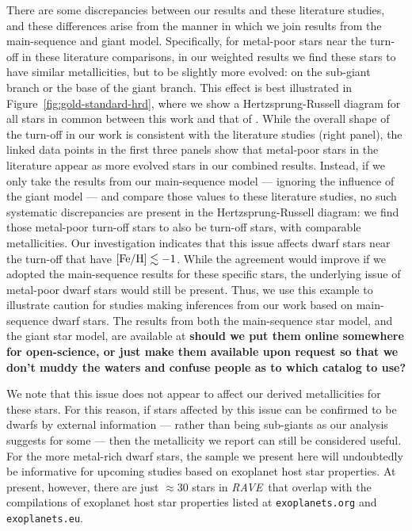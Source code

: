 \documentclass[preprint,trackchanges]{aastex}
\newcommand{\acronym}[1]{{\small{#1}}}
\newcommand{\project}[1]{\textsl{#1}}
\newcommand{\rave}{\project{\acronym{RAVE}}}
\newcommand{\stub}[1]{{\color{blue} \textbf{#1}}}
\begin{document}
There are some discrepancies between our results and these literature studies,
and these differences arise from the manner in which we join results from the
main-sequence and giant model.  Specifically, for metal-poor stars near
the turn-off in these literature comparisons, in our weighted results we find 
these stars to have similar metallicities, but to be slightly more evolved: 
on the sub-giant branch or the base of the giant branch.  This effect is best
illustrated in Figure~\ref{fig:gold-standard-hrd}, where we show a 
Hertzsprung-Russell diagram for all stars in common between this work and that
of \citet{Bensby_2014,Reddy_2003,Reddy_2006,Valenti_Fischer_2005}.  While the
overall shape of the turn-off in our work is consistent with the literature
studies (right panel), the linked data points in the first three panels show that metal-poor stars in the literature
appear as more evolved stars in our combined results.  Instead, if we only
take the results from our main-sequence model --- ignoring the influence of the
giant model --- and compare those values to these literature studies, no such 
systematic discrepancies are present in the Hertzsprung-Russell diagram: we 
find those metal-poor turn-off stars to also be turn-off stars, with comparable
metallicities.  Our investigation indicates that this issue affects dwarf stars
near the turn-off that have $[{\rm Fe/H}] \lesssim -1$.  While the agreement
would improve if we adopted the main-sequence results for these specific stars,
the underlying issue of metal-poor dwarf stars would still be present.  Thus,
we use this example to illustrate caution for studies making inferences from our
work based on main-sequence dwarf stars.  The results from both the main-sequence star model, 
and the giant star model, are available at \stub{should we put them online somewhere
for open-science, or just make them available upon request so that we don't
muddy the waters and confuse people as to which catalog to use?}


We note that this issue does not appear to affect our derived metallicities for these
stars.  For this reason, if stars affected by this issue can be confirmed to be
dwarfs by external information --- rather than being sub-giants as our analysis
suggests for some --- then the metallicity we report can still be considered
useful.  For the more metal-rich dwarf stars, the sample we present here
will undoubtedly be informative for upcoming studies based on exoplanet host
star properties.  At present, however, there are just $\approx$30 stars in 
\rave\ that overlap with the compilations of exoplanet host star properties 
listed at \texttt{exoplanets.org} and \texttt{exoplanets.eu}.
\end{document}
